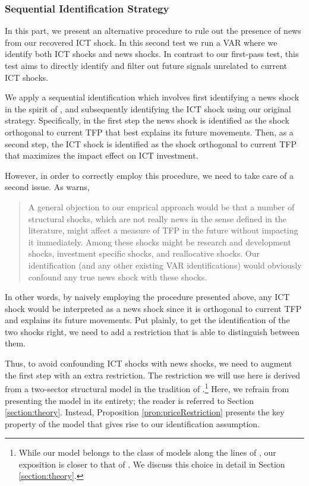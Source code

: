 \documentclass[12pt]{article}
\begin{document}
\subsubsection{Sequential Identification Strategy}\label{section:twosteps}

In this part, we present an alternative procedure to rule out the presence of news from our recovered ICT shock. In this second test we run a VAR where we identify both ICT shocks and news shocks. In contrast to our first-pass test, this test aims to directly identify and filter out future signals unrelated to current ICT shocks.

We apply a sequential identification which involves first identifying a news shock in the spirit of \cite{barsky2011news}, and subsequently identifying the ICT shock using our original strategy. Specifically, in the first step the news shock is identified as the shock orthogonal to current TFP that best explains its future movements. Then, as a second step, the ICT shock is identified as the shock orthogonal to current TFP that maximizes the impact effect on ICT investment. 

However, in order to correctly employ this procedure, we need to take care of a second issue. As \cite{barsky2011news} warns, 

\begin{quote} A general objection to our emprical approach would be that a number of structural shocks, which are not really news in the sense defined in the literature, might affect a measure of TFP in the future without impacting it immediately. Among these shocks might be research and development shocks, investment specific shocks, and reallocative shocks. Our identification (and any other existing VAR identifications) would obviously confound any true news shock with these shocks. %
\end{quote}

In other words, by naively employing the procedure presented above, any ICT shock would be interpreted as a news shock since it is orthogonal to current TFP and explains its future movements. Put plainly, to get the identification of the two shocks right, we need to add a restriction that is able to distinguish between them.

Thus, to avoid confounding ICT shocks with news shocks, we need to augment the first step with an extra restriction. The restriction we will use here is derived from a two-sector structural model in the tradition of \cite{greenwood1997long}.\footnote{While our model belongs to the class of models along the lines of \cite{greenwood1997long}, our exposition is closer to that of \cite{oulton2007investment}. We discuss this choice in detail in Section \ref{section:theory}.} Here, we refrain from presenting the model in its entirety; the reader is referred to Section \ref{section:theory}. Instead, Proposition \ref{prop:priceRestriction} presents the key property of the model that gives rise to our identification assumption. 
\end{document}
